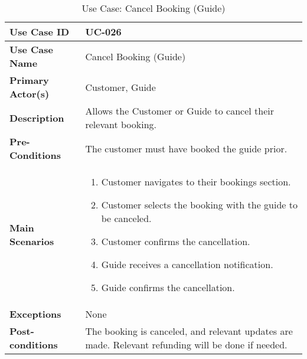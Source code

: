 \begin{table}[ht]
    \centering
    \begin{tabular}{|l|p{}|}
        \hline
        \textbf{Use Case ID} & UC-026 \\
        \hline
        \textbf{Use Case Name} & Cancel Booking (Guide) \\
        \hline
        \textbf{Primary Actor(s)} & Customer, Guide \\
        \hline
        \textbf{Description} & Allows the Customer or Guide to cancel their relevant booking. \\
        \hline
        \textbf{Pre-Conditions} & The customer must have booked the guide prior. \\
        \hline
        \textbf{Main Scenarios} & 
        \begin{enumerate}[label=\arabic*.,itemsep=0pt]
            \item Customer navigates to their bookings section.
            \item Customer selects the booking with the guide to be canceled.
            \item Customer confirms the cancellation.
            \item Guide receives a cancellation notification.
            \item Guide confirms the cancellation.
        \end{enumerate} \\
        \hline
        \textbf{Exceptions} & None \\
        \hline
        \textbf{Post-conditions} & The booking is canceled, and relevant updates are made. Relevant refunding will be done if needed. \\
        \hline
    \end{tabular}
    \label{tab:use-case-cancel-hire-guide}
    \caption{Use Case: Cancel Booking (Guide)}
\end{table}

